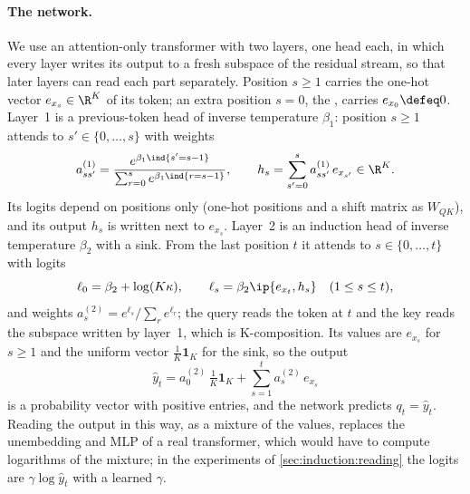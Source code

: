 \begin{refsection}
\paragraph{The network.} We use an attention-only transformer with two layers, one head each, in which every layer writes its output to a fresh subspace of the residual stream, so that later layers can read each part separately. Position $s\ge1$ carries the one-hot vector $e_{x_s}\in\R^K$ of its token; an extra position $s=0$, the , carries $e_{x_0}\defeq0$. Layer~1 is a previous-token head of inverse temperature $\beta_1$: position $s\ge1$ attends to $s'\in\{0,\dots,s\}$ with weights
\begin{equation}\label{eq:induction:layer1}
  a^{(1)}_{ss'}=\frac{e^{\beta_1\ind\{s'=s-1\}}}{\sum_{r=0}^se^{\beta_1\ind\{r=s-1\}}},\qquad h_s=\sum_{s'=0}^sa^{(1)}_{ss'}\,e_{x_{s'}}\in\R^K .
\end{equation}
Its logits depend on positions only (one-hot positions and a shift matrix as $W_{QK}$), and its output $h_s$ is written next to $e_{x_s}$. Layer~2 is an induction head of inverse temperature $\beta_2$ with a sink. From the last position $t$ it attends to $s\in\{0,\dots,t\}$ with logits
\begin{equation}\label{eq:induction:layer2}
  \ell_0=\beta_2+\log(K\kappa),\qquad \ell_s=\beta_2\ip{e_{x_t},h_s}\quad(1\le s\le t),
\end{equation}
and weights $a^{(2)}_s=e^{\ell_s}/\sum_re^{\ell_r}$; the query reads the token at $t$ and the key reads the subspace written by layer~1, which is K-composition. Its values are $e_{x_s}$ for $s\ge1$ and the uniform vector $\frac1K\mathbf1_K$ for the sink, so the output
\begin{equation}\label{eq:induction:output}
  \hat y_t=a^{(2)}_0\,\tfrac1K\mathbf 1_K+\sum_{s=1}^ta^{(2)}_s\,e_{x_s}
\end{equation}
is a probability vector with positive entries, and the network predicts $q_t=\hat y_t$. Reading the output in this way, as a mixture of the values, replaces the unembedding and MLP of a real transformer, which would have to compute logarithms of the mixture; in the experiments of \cref{sec:induction:reading} the logits are $\gamma\log\hat y_t$ with a learned $\gamma$.


\end{refsection}
